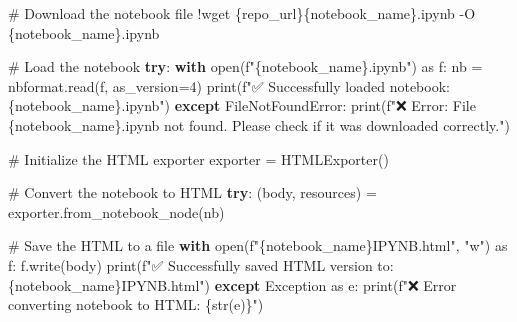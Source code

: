 \documentclass[
  11pt,
  letterpaper,
]{book}
\newenvironment{Shaded}{\begin{snugshade}}{\end{snugshade}}
\newcommand{\BuiltInTok}[1]{\textcolor[rgb]{0.00,0.23,0.31}{#1}}
\newcommand{\CommentTok}[1]{\textcolor[rgb]{0.37,0.37,0.37}{#1}}
\newcommand{\ControlFlowTok}[1]{\textcolor[rgb]{0.00,0.23,0.31}{\textbf{#1}}}
\newcommand{\DecValTok}[1]{\textcolor[rgb]{0.68,0.00,0.00}{#1}}
\newcommand{\ImportTok}[1]{\textcolor[rgb]{0.00,0.46,0.62}{#1}}
\newcommand{\NormalTok}[1]{\textcolor[rgb]{0.00,0.23,0.31}{#1}}
\newcommand{\OperatorTok}[1]{\textcolor[rgb]{0.37,0.37,0.37}{#1}}
\newcommand{\PreprocessorTok}[1]{\textcolor[rgb]{0.68,0.00,0.00}{#1}}
\newcommand{\SpecialCharTok}[1]{\textcolor[rgb]{0.37,0.37,0.37}{#1}}
\newcommand{\SpecialStringTok}[1]{\textcolor[rgb]{0.13,0.47,0.30}{#1}}
\newcommand{\StringTok}[1]{\textcolor[rgb]{0.13,0.47,0.30}{#1}}
\begin{document}
\begin{Shaded}
\begin{Highlighting}[]
\CommentTok{\# Download the notebook file}
\OperatorTok{!}\NormalTok{wget \{repo\_url\}\{notebook\_name\}.ipynb }\OperatorTok{{-}}\NormalTok{O \{notebook\_name\}.ipynb}

\CommentTok{\# Load the notebook}
\ControlFlowTok{try}\NormalTok{:}
  \ControlFlowTok{with} \BuiltInTok{open}\NormalTok{(}\SpecialStringTok{f"}\SpecialCharTok{\{}\NormalTok{notebook\_name}\SpecialCharTok{\}}\SpecialStringTok{.ipynb"}\NormalTok{) }\ImportTok{as}\NormalTok{ f:}
\NormalTok{    nb }\OperatorTok{=}\NormalTok{ nbformat.read(f, as\_version}\OperatorTok{=}\DecValTok{4}\NormalTok{)}
  \BuiltInTok{print}\NormalTok{(}\SpecialStringTok{f"✅ Successfully loaded notebook: }\SpecialCharTok{\{}\NormalTok{notebook\_name}\SpecialCharTok{\}}\SpecialStringTok{.ipynb"}\NormalTok{)}
\ControlFlowTok{except} \PreprocessorTok{FileNotFoundError}\NormalTok{:}
  \BuiltInTok{print}\NormalTok{(}\SpecialStringTok{f"❌ Error: File \textquotesingle{}}\SpecialCharTok{\{}\NormalTok{notebook\_name}\SpecialCharTok{\}}\SpecialStringTok{.ipynb\textquotesingle{} not found. Please check if it was downloaded correctly."}\NormalTok{)}

\CommentTok{\# Initialize the HTML exporter}
\NormalTok{exporter }\OperatorTok{=}\NormalTok{ HTMLExporter()}

\CommentTok{\# Convert the notebook to HTML}
\ControlFlowTok{try}\NormalTok{:}
\NormalTok{    (body, resources) }\OperatorTok{=}\NormalTok{ exporter.from\_notebook\_node(nb)}

    \CommentTok{\# Save the HTML to a file}
    \ControlFlowTok{with} \BuiltInTok{open}\NormalTok{(}\SpecialStringTok{f"}\SpecialCharTok{\{}\NormalTok{notebook\_name}\SpecialCharTok{\}}\SpecialStringTok{IPYNB.html"}\NormalTok{, }\StringTok{"w"}\NormalTok{) }\ImportTok{as}\NormalTok{ f:}
\NormalTok{        f.write(body)}
    \BuiltInTok{print}\NormalTok{(}\SpecialStringTok{f"✅ Successfully saved HTML version to: }\SpecialCharTok{\{}\NormalTok{notebook\_name}\SpecialCharTok{\}}\SpecialStringTok{IPYNB.html"}\NormalTok{)}
\ControlFlowTok{except} \PreprocessorTok{Exception} \ImportTok{as}\NormalTok{ e:}
    \BuiltInTok{print}\NormalTok{(}\SpecialStringTok{f"❌ Error converting notebook to HTML: }\SpecialCharTok{\{}\BuiltInTok{str}\NormalTok{(e)}\SpecialCharTok{\}}\SpecialStringTok{"}\NormalTok{)}
\end{Highlighting}
\end{Shaded}
\end{document}
